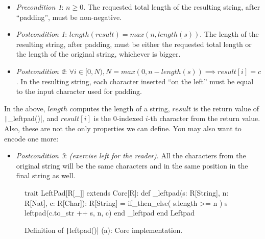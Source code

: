 \documentclass[11pt]{article}
\newcommand{\ScalaI}[1]{\texttt|#1|}
\begin{document}
\newcommand{\leftpadprea} {$ n \geqslant 0 $}
\newcommand{\leftpadposta}{$ length(result) = max(n, length(s)) $} 
\newcommand{\leftpadpostb}{$ \forall i \in [0, N), N = max(0, n - length(s)) \implies result[i] = c $}

\begin{itemize}
  \item \textit{Precondition 1}:  \leftpadprea.\newline
  The requested total length of the resulting string, after ``padding'', must 
  be non-negative.
  
  \item \textit{Postcondition 1}: \leftpadposta.\newline
  The length of the resulting string, after padding, must be either the 
  requested total length or the length of the original string, whichever is 
  bigger.
  
  \item \textit{Postcondition 2}: \leftpadpostb.\newline
  In the resulting string, each character inserted ``on the left'' must be 
  equal to the input character used for padding.
\end{itemize}

\noindent In the above, $length$ computes the length of a string, $result$ is 
the return value of \ScalaI{_leftpad()}, and $result[i]$ is the $0$-indexed 
$i$-th character from the return value. Also, these are not the only 
properties we can define. You may also want to encode one more:

\begin{itemize}
  \item \textit{Postcondition 3}: \textit{(exercise left for the 
  reader)}.\newline
  All the characters from the original string will be the same characters and 
  in the same position in the final string as well.
\end{itemize}


\begin{figure}[tb]
\begin{ScalaBlock}
trait LeftPad[R[_]] extends Core[R]:
  def _leftpad(s: R[String], n: R[Nat], c: R[Char]): R[String] =
    if_then_else( s.length >= n ) {
      s
    } {
      leftpad(c.to_str ++ s, n, c)
    }
  end _leftpad
end Leftpad
\end{ScalaBlock}
\caption{Definition of \ScalaI{leftpad()} (a): Core implementation.}
\label{fig:props:leftpad:a}
\hrulefill
\end{figure}
\end{document}
